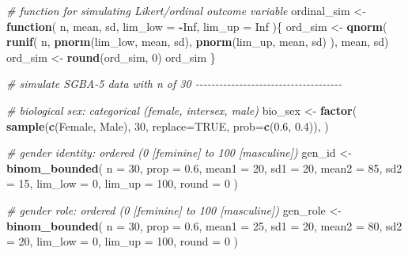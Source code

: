 \documentclass[
]{book}
\newenvironment{Shaded}{\begin{snugshade}}{\end{snugshade}}
\newcommand{\AttributeTok}[1]{\textcolor[rgb]{0.13,0.29,0.53}{#1}}
\newcommand{\CommentTok}[1]{\textcolor[rgb]{0.56,0.35,0.01}{\textit{#1}}}
\newcommand{\ConstantTok}[1]{\textcolor[rgb]{0.56,0.35,0.01}{#1}}
\newcommand{\ControlFlowTok}[1]{\textcolor[rgb]{0.13,0.29,0.53}{\textbf{#1}}}
\newcommand{\DecValTok}[1]{\textcolor[rgb]{0.00,0.00,0.81}{#1}}
\newcommand{\FloatTok}[1]{\textcolor[rgb]{0.00,0.00,0.81}{#1}}
\newcommand{\FunctionTok}[1]{\textcolor[rgb]{0.13,0.29,0.53}{\textbf{#1}}}
\newcommand{\NormalTok}[1]{#1}
\newcommand{\OtherTok}[1]{\textcolor[rgb]{0.56,0.35,0.01}{#1}}
\newcommand{\SpecialCharTok}[1]{\textcolor[rgb]{0.81,0.36,0.00}{\textbf{#1}}}
\newcommand{\StringTok}[1]{\textcolor[rgb]{0.31,0.60,0.02}{#1}}
\begin{document}
\begin{Shaded}
\begin{Highlighting}[]
\CommentTok{\# function for simulating Likert/ordinal outcome variable}
\NormalTok{ordinal\_sim }\OtherTok{\textless{}{-}} \ControlFlowTok{function}\NormalTok{(}
\NormalTok{    n, mean, sd, }\AttributeTok{lim\_low =} \SpecialCharTok{{-}}\ConstantTok{Inf}\NormalTok{, }\AttributeTok{lim\_up =} \ConstantTok{Inf}
\NormalTok{    )\{}
\NormalTok{  ord\_sim }\OtherTok{\textless{}{-}} \FunctionTok{qnorm}\NormalTok{(}
    \FunctionTok{runif}\NormalTok{(}
\NormalTok{      n, }\FunctionTok{pnorm}\NormalTok{(lim\_low, mean, sd), }\FunctionTok{pnorm}\NormalTok{(lim\_up, mean, sd)}
\NormalTok{      ),}
\NormalTok{    mean, sd)}
\NormalTok{  ord\_sim }\OtherTok{\textless{}{-}} \FunctionTok{round}\NormalTok{(ord\_sim, }\DecValTok{0}\NormalTok{)}
\NormalTok{  ord\_sim}
\NormalTok{\}}


\CommentTok{\# simulate SGBA{-}5 data with n of 30 {-}{-}{-}{-}{-}{-}{-}{-}{-}{-}{-}{-}{-}{-}{-}{-}{-}{-}{-}{-}{-}{-}{-}{-}{-}{-}{-}{-}{-}{-}{-}{-}{-}{-}{-}{-}{-}}

\CommentTok{\# biological sex: categorical (female, intersex, male)}
\NormalTok{bio\_sex }\OtherTok{\textless{}{-}} \FunctionTok{factor}\NormalTok{(}
  \FunctionTok{sample}\NormalTok{(}\FunctionTok{c}\NormalTok{(}\StringTok{\textquotesingle{}Female\textquotesingle{}}\NormalTok{, }\StringTok{\textquotesingle{}Male\textquotesingle{}}\NormalTok{), }\DecValTok{30}\NormalTok{, }\AttributeTok{replace=}\ConstantTok{TRUE}\NormalTok{, }\AttributeTok{prob=}\FunctionTok{c}\NormalTok{(}\FloatTok{0.6}\NormalTok{, }\FloatTok{0.4}\NormalTok{)),}
\NormalTok{  )}

\CommentTok{\# gender identity: ordered (0 [feminine] to 100 [masculine])}
\NormalTok{gen\_id }\OtherTok{\textless{}{-}} \FunctionTok{binom\_bounded}\NormalTok{(}
  \AttributeTok{n =} \DecValTok{30}\NormalTok{, }\AttributeTok{prop =} \FloatTok{0.6}\NormalTok{, }\AttributeTok{mean1 =} \DecValTok{20}\NormalTok{, }\AttributeTok{sd1 =} \DecValTok{20}\NormalTok{, }\AttributeTok{mean2 =} \DecValTok{85}\NormalTok{, }\AttributeTok{sd2 =} \DecValTok{15}\NormalTok{, }\AttributeTok{lim\_low =} \DecValTok{0}\NormalTok{,}
  \AttributeTok{lim\_up =} \DecValTok{100}\NormalTok{, }\AttributeTok{round =} \DecValTok{0}
\NormalTok{)}

\CommentTok{\# gender role: ordered (0 [feminine] to 100 [masculine])}
\NormalTok{gen\_role }\OtherTok{\textless{}{-}} \FunctionTok{binom\_bounded}\NormalTok{(}
  \AttributeTok{n =} \DecValTok{30}\NormalTok{, }\AttributeTok{prop =} \FloatTok{0.6}\NormalTok{, }\AttributeTok{mean1 =} \DecValTok{25}\NormalTok{, }\AttributeTok{sd1 =} \DecValTok{20}\NormalTok{, }\AttributeTok{mean2 =} \DecValTok{80}\NormalTok{, }\AttributeTok{sd2 =} \DecValTok{20}\NormalTok{, }\AttributeTok{lim\_low =} \DecValTok{0}\NormalTok{,}
  \AttributeTok{lim\_up =} \DecValTok{100}\NormalTok{, }\AttributeTok{round =} \DecValTok{0}
\NormalTok{)}



\end{Highlighting}
\end{Shaded}
\end{document}
